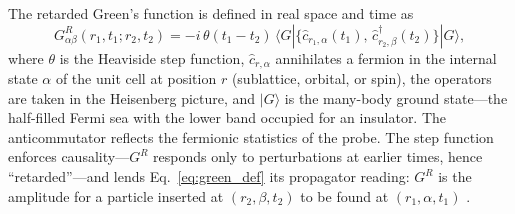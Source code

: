 \documentclass[onecolumn,aps,prl,superscriptaddress,longbibliography]{revtex4-2}
\begin{document}
The retarded Green's function is defined in real space and time as \cite{estakeRoy2025,bruusFlensberg2016}
\begin{equation}\label{eq:green_def}
  G^R_{\alpha\beta}(r_1,t_1;r_2,t_2) = -i\,\theta(t_1-t_2)\,\langle G|\{\hat{c}_{r_1,\alpha}(t_1),\,\hat{c}^{\dagger}_{r_2,\beta}(t_2)\}|G\rangle,
\end{equation}
where $\theta$ is the Heaviside step function, $\hat{c}_{r,\alpha}$ annihilates a fermion in the internal state $\alpha$ of the unit cell at position $r$ (sublattice, orbital, or spin), the operators are taken in the Heisenberg picture, and $|G\rangle$ is the many-body ground state---the half-filled Fermi sea with the lower band occupied for an insulator. The anticommutator reflects the fermionic statistics of the probe. The step function enforces causality---$G^R$ responds only to perturbations at earlier times, hence ``retarded''---and lends Eq.~\eqref{eq:green_def} its propagator reading: $G^R$ is the amplitude for a particle inserted at $(r_2,\beta,t_2)$ to be found at $(r_1,\alpha,t_1)$ \cite{bruusFlensberg2016}.
\end{document}
